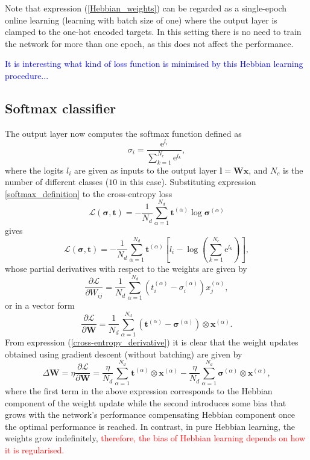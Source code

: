 \documentclass[a4paper, 11pt]{article}
\begin{document}
Note that expression (\ref{Hebbian_weights}) can be regarded as a single-epoch online learning (learning with batch size of one) where the output layer is clamped to the one-hot encoded targets. In this setting there is no need to train the network for more than one epoch, as this does not affect the performance.

\textcolor{blue}{It is interesting what kind of loss function is minimised by this Hebbian learning procedure...}

\subsection{Softmax classifier}
The output layer now computes the softmax function defined as
\begin{equation} \label{softmax_definition}
  \sigma_i = \frac{\mathrm e^{l_i}}{\sum_{k=1}^{N_c}\mathrm e^{l_k}}, 
\end{equation}
where the logits $l_i$ are given as inputs to the output layer $\mathbf l = \mathbf W \mathbf x$, and $N_c$ is the number of different classes ($10$ in this case). Substituting expression \ref{softmax_definition} to the cross-entropy loss
\begin{equation}
  \mathcal L(\boldsymbol\sigma, \mathbf t) = -\frac{1}{{N_d}}\sum_{\alpha=1}^{N_d}\mathbf t^{(\alpha)}\log\boldsymbol\sigma^{(\alpha)}
\end{equation}
gives
\begin{equation*}
  \mathcal L(\boldsymbol\sigma, \mathbf t) = -\frac{1}{{N_d}}\sum_{\alpha=1}^{N_d}\mathbf t^{(\alpha)}\left[l_i - \log\left(\sum_{k=1}^{N_c}\mathrm e^{l_k}\right)\right],
\end{equation*}
whose partial derivatives with respect to the weights are given by
\begin{equation}
  \frac{\partial \mathcal L}{\partial W_{ij}} = \frac{1}{{N_d}}\sum_{\alpha=1}^{N_d}\left(t_i^{(\alpha)} - \sigma_i^{(\alpha)}\right)x_j^{(\alpha)},
\end{equation}
or in a vector form
\begin{equation}\label{cross-entropy_derivative}
  \frac{\partial \mathcal L}{\partial \mathbf W} = \frac{1}{{N_d}}\sum_{\alpha=1}^{N_d}\left(\mathbf t^{(\alpha)} - \boldsymbol\sigma^{(\alpha)}\right)\otimes\mathbf x^{(\alpha)}.
\end{equation}
From expression (\ref{cross-entropy_derivative}) it is clear that the weight updates obtained using gradient descent (without batching) are given by
\begin{equation}
  \Delta\mathbf W = \eta\frac{\partial \mathcal L}{\partial \mathbf W} = \frac{\eta}{{N_d}}\sum_{\alpha=1}^{N_d}\mathbf t^{(\alpha)}\otimes\mathbf x^{(\alpha)} - \frac{\eta}{{N_d}}\sum_{\alpha=1}^{N_d}\boldsymbol\sigma^{(\alpha)}\otimes\mathbf x^{(\alpha)},
\end{equation}
where the first term in the above expression corresponds to the Hebbian component of the weight update while the second introduces some bias that grows with the network's performance compensating Hebbian component once the optimal performance is reached. In contrast, in pure Hebbian learning, the weights grow indefinitely, \textcolor{red}{therefore, the bias of Hebbian learning depends on how it is regularised.}
\end{document}
